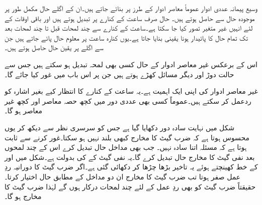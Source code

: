 وسیع پیمانہ عددی ادوار عموماً معاصر ادوار کے طرز پر بنائے جاتے ہیں۔ان کے اگلے حال مکمل طور پر موجودہ حال سے حاصل ہوتے ہیں۔ حال صرف ساعت کے کنارے پر تبدیل ہوتے ہیں اور باقی اوقات کے لئے انہیں غیر متغیر تصور کیا جا سکتا ہے۔ساعت کے کنارے سے چند لمحات قبل تا چند لمحات بعد تک تمام حال کا پائیدار ہونا یقینی بنایا جاتا ہے۔یوں کنارہ ساعت پر معلوم حال پائے جاتے ہیں جن سے اگلے پر یقین حال حاصل ہوتے ہیں۔ 

اس کے برعکس غیر معاصر ادوار کے حال کسی بھی لمحہ تبدیل ہو سکتے ہیں جس سے حالت دوڑ اور دیگر مسائل کھڑے ہوتے ہیں جن پر اس باب میں غور کیا جائے گا۔

غیر معاصر ادوار کی اپنی ایک اہمیت ہے۔یہ ساعت کے کنارے کا انتظار کیے بغیر اشارہ کو ردعمل کر سکتے ہیں۔عموماً کسی بھی عددی دور میں کچھ حصہ معاصر اور کچھ غیر معاصر ہو گا۔

شکل  میں نہایت سادہ دور دکھایا گیا ہے جس کو سرسری نظر سے دیکھ کر یوں محسوس ہوتا ہے کہ ضرب گیٹ کا مخارج کبھی بلند نہیں ہو سکتا۔غور کرنے سے ثابت ہوتا ہے کہ مسئلہ اتنا سادہ نہیں۔ جب بھی مداخل  حال تبدیل کرے اس کے چند لمحوں بعد نفی گیٹ کا مخارج حال تبدیل کرے گا۔یہ  نفی گیٹ کے  کی بدولت ہے۔شکل میں  اور  کے خط کھینچتے ہوئے یہ تاخیر بڑھا چڑھا کر  دکھائی گئی ہے۔اگر ضرب گیٹ کا دورانیہ ردِ عمل صفر ہوتا تب ضرب گیٹ کا مخارج ان دو مداخل کے مطابق حال  اختیار کرتا۔حقیقتاً ضرب گیٹ کو بھی ردِ عمل کے لئے چند لمحات درکار ہوں گے لہٰذا ضرب گیٹ کا مخارج  ہو گا۔

